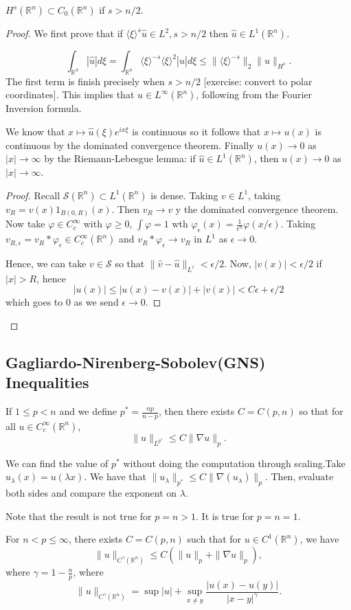 \documentclass[12pt]{scrartcl}
\newcommand{\R}{\mathbb{R}}
\renewcommand{\hat}{\widehat}
\newcommand{\<}{\langle}
\renewcommand{\>}{\rangle}
\let \phi \varphi
\let \mc \mathcal
\let \grad \nabla
\begin{document}
\begin{thm} $H^s(\R^n) \subset C_0(\R^n)$ if $s > n/2$.
\end{thm}
\begin{proof}
We first prove that if $\<\xi\>^s \hat{u} \in L^2, s > n/2$ then $\hat{u} \in L^1(\R^n)$.  

$$\int_{\R^n} |\hat{u}|d\xi = \int_{\R^n} \<\xi\>^{-s}\<\xi\>^2 |\hat{u}| d\xi \le \|\<\xi\>^{-s} \|_2 \|u\|_{H^s}.$$
The first term is finish precisely when $s > n/2$ [exercise: convert to polar coordinates]. This implies that $u \in L^\infty(\R^n)$, following from the Fourier Inversion formula.  

We know that $x \mapsto \hat{u}(\xi)e^{ix \xi}$ is continuous so it follows that $x \mapsto u(x)$ is continuous by the dominated convergence theorem.  Finally $u(x) \to 0$ as $|x| \to \infty$ by the Riemann-Lebesgue lemma: if $\hat{u} \in L^1(\R^n)$, then $u(x) \to 0$ as $|x| \to \infty$.
\begin{proof}
Recall $\mc S(\R^n) \subset L^1(\R^n)$ is dense.  Taking $v \in L^1$, taking $v_R = v(x) 1_{B(0, R)}(x)$.  Then $v_{R} \to v$ y the dominated convergence theorem.  Now take $\phi \in C_c^\infty$ with $\phi \ge 0$, $\int \phi = 1$ wth $\phi_\epsilon(x) = \frac{1}{\epsilon^n} \phi(x/\epsilon)$.  Taking $v_{R, \epsilon} = v_R * \phi_\epsilon \in C_c^\infty(\R^n)$ and $v_R*\phi_\epsilon \to v_R$ in $L^1$ as $\epsilon \to 0$.

Hence, we can take $v \in \mc S$ so that $\|\hat{v} - \hat{u} \|_{L^1} < \epsilon/2$.  Now, $|v(x)| < \epsilon/2$ if $|x| > R$, hence $$|u(x)| \le |u(x) - v(x)| + |v(x)| < C\epsilon + \epsilon/2$$
which goes to $0$ as we send $\epsilon \to 0$.
\end{proof}
\end{proof}

\subsection{Gagliardo-Nirenberg-Sobolev(GNS) Inequalities}
\begin{theorem}
If $1 \le p < n$ and we define $p^* = \frac{np}{n-p}$, then there exists $C = C(p, n)$ so that for all $u \in C_c^\infty(\R^n)$, $$\|u\|_{L^{p^*}} \le C \|\grad u\|_p.$$
\end{theorem}
\begin{remark} We can find the value of $p^*$ without doing the computation through scaling.Take $u_\lambda(x) = u(\lambda x)$.  We have that $\|u_\lambda \|_{p^*} \le C \| \grad (u_\lambda)\|_p$.  Then, evaluate both sides and compare the exponent on $\lambda$.

Note that the result is not true for $p = n > 1$.  It is true for $p = n = 1$.  
\end{remark}
\begin{theorem} For $n < p \le \infty$, there exists $C = C(p, n)$ such that for $u \in C^1(\R^n)$, we have $$\|u\|_{C^\gamma(\R^n)} \le C(\|u\|_p + \|\grad u \|_p),$$
where $\gamma = 1 - \frac{n}{p}$, where
$$\|u\|_{C^\gamma(\R^n)} = \sup |u| + \sup_{x \ne y} \frac{|u(x) - u(y)|}{|x - y|^\gamma}.$$
\end{theorem}
\end{document}
